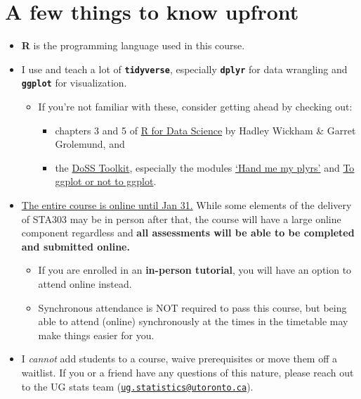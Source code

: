 \documentclass[
  openany]{book}
\begin{document}
\hypertarget{a-few-things-to-know-upfront}{%
\section{A few things to know upfront}\label{a-few-things-to-know-upfront}}

\begin{itemize}
\item
  \textbf{R} is the programming language used in this course.
\item
  I use and teach a lot of \textbf{\texttt{tidyverse}}, especially \textbf{\texttt{dplyr}} for data wrangling and \textbf{\texttt{ggplot}} for visualization.

  \begin{itemize}
  \item
    If you're not familiar with these, consider getting ahead by checking out:

    \begin{itemize}
    \item
      chapters 3 and 5 of \href{https://r4ds.had.co.nz/}{R for Data Science} by Hadley Wickham \& Garret Grolemund, and
    \item
      the \href{https://dosstoolkit.com/}{DoSS Toolkit}, especially the modules \href{https://dosstoolkit.com/\#hand-me-my-plyrs}{`Hand me my plyrs'} and \href{https://dosstoolkit.com/\#to-ggplot-or-not-to-ggplot}{To ggplot or not to ggplot}.
    \end{itemize}
  \end{itemize}
\item
  \href{https://www.utoronto.ca/utogether/covid-19-planning-update}{The entire course is online until Jan 31.} While some elements of the delivery of STA303 may be in person after that, the course will have a large online component regardless and \textbf{all assessments will be able to be completed and submitted online.}

  \begin{itemize}
  \item
    If you are enrolled in an \textbf{in-person tutorial}, you will have an option to attend online instead.
  \item
    Synchronous attendance is NOT required to pass this course, but being able to attend (online) synchronously at the times in the timetable may make things easier for you.
  \end{itemize}
\item
  I \emph{cannot} add students to a course, waive prerequisites or move them off a waitlist. If you or a friend have any questions of this nature, please reach out to the UG stats team (\href{mailto:ug.statistics@utoronto.ca}{\nolinkurl{ug.statistics@utoronto.ca}}).


\end{itemize}
\end{document}

